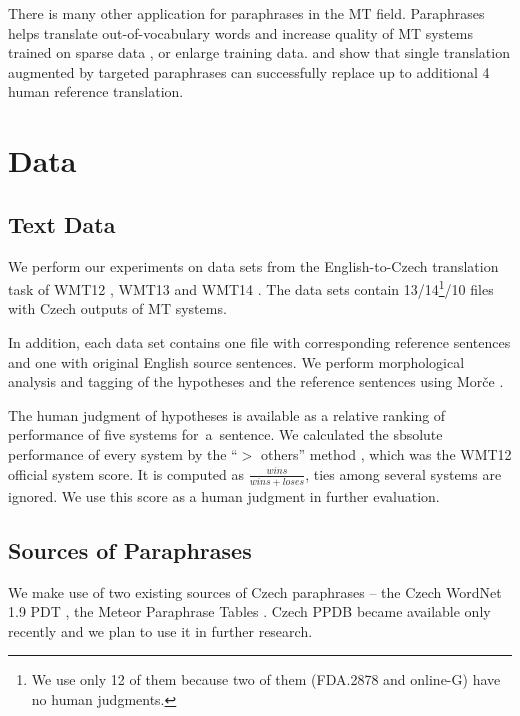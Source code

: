 \documentclass[11pt]{article}
\def \xxx#1{\textbf{\textcolor{red}{xxx: #1}}}
\begin{document}
There is many other application for paraphrases in the MT field. Paraphrases 
helps translate out-of-vocabulary words and increase quality of MT systems 
trained on sparse data \cite{Callison-Burch:2006}, \cite{Marton:2009} or 
enlarge training data. \cite{nakov2008improved}
 and  show that single 
translation augmented by targeted paraphrases can successfully replace up to
additional 4 human reference translation.
 

\section{Data}
\label{Data}
\subsection{Text Data}
We perform our experiments on data sets from the English-to-Czech translation 
task of WMT12 \cite{wmt12}, WMT13 \cite{wmt13} and WMT14 \cite{wmt14}. The data
sets contain 13/14\footnote{We use only 12 of them because two of them 
(FDA.2878 and online-G) have no human judgments.}/10 files with Czech outputs 
of MT systems.

In addition, each data set contains one file with corresponding reference 
sentences and one with original English source sentences. We perform 
morphological analysis and tagging of the hypotheses and the reference 
sentences using Morče \cite{morce:2007}.

The human judgment of hypotheses is available as a relative ranking of 
performance of five systems for~a~sentence. We calculated the sbsolute 
performance of every system by the “$ > $ others” method \cite{bojar-grains}, 
which was the WMT12 official system score. It is computed as 
$ \frac{wins}{wins+loses} $, ties among several systems are ignored. We use 
this score as a human judgment in further evaluation.

\subsection{Sources of Paraphrases}
\label{meteori}
We make use of two existing sources of Czech paraphrases -- the Czech WordNet 
1.9 PDT \cite{czech-wordnet}, the Meteor Paraphrase Tables \cite{meteor-tables}. 
Czech PPDB \cite{ppdb} became available only recently and we plan to use it in 
further research.
\end{document}
